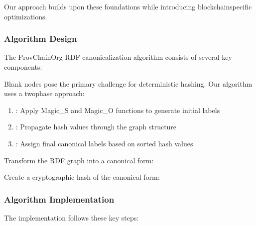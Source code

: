 \documentclass[letterpaper,10pt,english]{sphinxmanual}
\begin{document}
\sphinxAtStartPar
Our approach builds upon these foundations while introducing blockchain\sphinxhyphen{}specific optimizations.


\subsubsection{Algorithm Design}
\label{\detokenize{research/rdf-canonicalization-algorithm:algorithm-design}}
\sphinxAtStartPar
The ProvChainOrg RDF canonicalization algorithm consists of several key components:
\begin{description}
\sphinxAtStartPar
Blank nodes pose the primary challenge for deterministic hashing. Our algorithm uses a two\sphinxhyphen{}phase approach:
\begin{enumerate}
%
\item {} 
\sphinxAtStartPar
{}: Apply Magic\_S and Magic\_O functions to generate initial labels

\item {} 
\sphinxAtStartPar
{}: Propagate hash values through the graph structure

\item {} 
\sphinxAtStartPar
{}: Assign final canonical labels based on sorted hash values

\end{enumerate}

\sphinxAtStartPar
Transform the RDF graph into a canonical form:

\sphinxAtStartPar
Create a cryptographic hash of the canonical form:

\end{description}


\subsubsection{Algorithm Implementation}
\label{\detokenize{research/rdf-canonicalization-algorithm:algorithm-implementation}}
\sphinxAtStartPar
The implementation follows these key steps:
\end{document}
